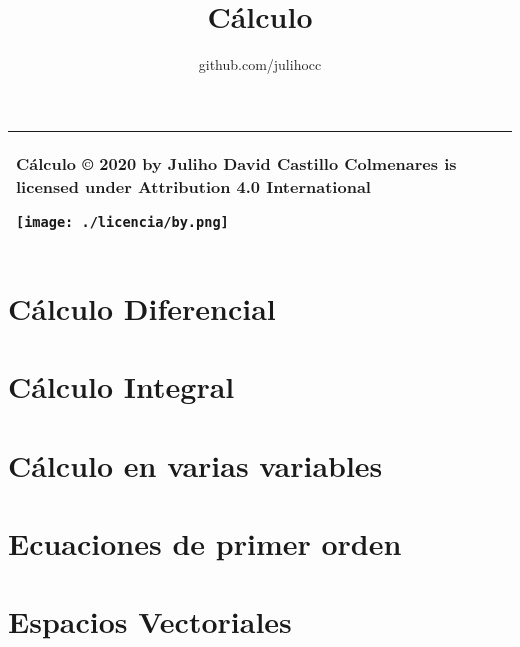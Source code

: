 \documentclass{tufte-book}
\title{Cálculo}
\author{github.com/julihocc}
\begin{document}
	\maketitle
\begin{tabular}{|p{}|}
	\hline
Cálculo © 2020 by Juliho David Castillo Colmenares is licensed under Attribution 4.0 International
	\begin{center}
		\texttt{[image: ./licencia/by.png]}
	\end{center}\\
	\hline
\end{tabular}
\tableofcontents

\chapter{Cálculo Diferencial}








\chapter{Cálculo Integral}









\chapter{Cálculo en varias variables}



\chapter{Ecuaciones de primer orden}





\chapter{Espacios Vectoriales}






\end{document}
